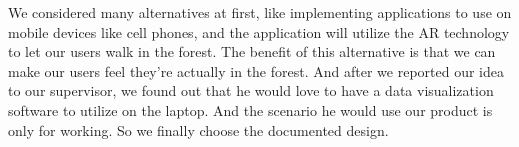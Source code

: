\documentclass[12pt, titlepage]{article}
\begin{document}
\begin{enumerate}
\begin{itemize}
We considered many alternatives at first, like implementing applications to use on mobile devices like cell phones, and the application will utilize the AR technology to let our users walk in the forest. The benefit of this alternative is that we can make our users feel they're actually in the forest. And after we reported our idea to our supervisor, we found out that he would love to have a data visualization software to utilize on the laptop. And the scenario he would use our product is only for working. So we finally choose the documented design. 
    
\end{itemize}


  
\end{enumerate}
\end{document}
